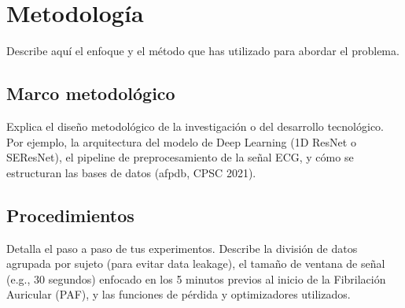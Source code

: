 
\chapter{Metodología}
\label{chap:metodologia}

Describe aquí el enfoque y el método que has utilizado para abordar el problema. 

\section{Marco metodológico}
\label{sec:marco_metodologico}
Explica el diseño metodológico de la investigación o del desarrollo tecnológico. Por ejemplo, la arquitectura del modelo de Deep Learning (1D ResNet o SEResNet), el pipeline de preprocesamiento de la señal ECG, y cómo se estructuran las bases de datos (afpdb, CPSC 2021).

\section{Procedimientos}
\label{sec:procedimientos}
Detalla el paso a paso de tus experimentos. Describe la división de datos agrupada por sujeto (para evitar data leakage), el tamaño de ventana de señal (e.g., 30 segundos) enfocado en los 5 minutos previos al inicio de la Fibrilación Auricular (PAF), y las funciones de pérdida y optimizadores utilizados.
